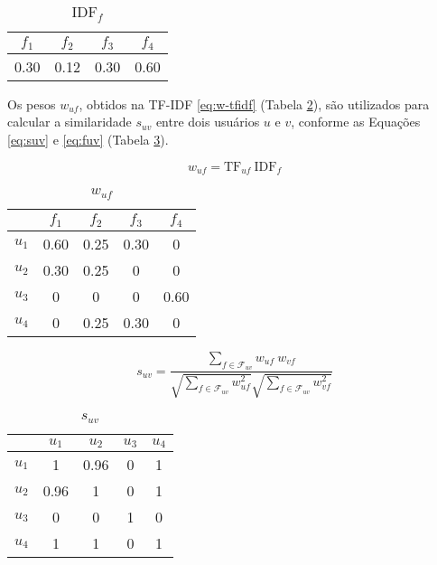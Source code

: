 \begin{table}[p]
\begin{center}
    \caption{$\mathrm{IDF}_{f}$}
    \label{tab:idf_f}
    \begin{tabular}{ | c | c | c | c | } 
    \hline
     $f_1$ & $f_2$ & $f_3$ & $f_4$   \\ \hline
     0.30 & 0.12 & 0.30 & 0.60  \\ \hline
     \end{tabular}
\end{center}
\end{table}

Os pesos $w_{uf}$, obtidos na TF-IDF \ref{eq:w-tfidf} (Tabela \ref{tab:w_uf}), são utilizados para calcular a similaridade $s_{uv}$ entre dois usuários $u$ e $v$, conforme as Equações \ref{eq:suv} e \ref{eq:fuv} (Tabela \ref{tab:s_uv}).

\begin{equation}
\label{eq:w-tfidf} 
    w_{uf} = \mathrm{TF}_{uf}~\mathrm{IDF}_{f}
\end{equation} 

\begin{table}[p]
\begin{center}
    \caption{$w_{uf}$}
    \label{tab:w_uf}
    \begin{tabular}{ | c | c | c | c | c | } 
    \hline
     & $f_1$ & $f_2$ & $f_3$ & $f_4$   \\ \hline
     $u_1$ & 0.60 & 0.25 & 0.30 & 0  \\ \hline
     $u_2$ & 0.30 & 0.25 & 0 & 0  \\ \hline
     $u_3$ & 0 & 0 & 0 & 0.60  \\ \hline
     $u_4$ & 0 & 0.25 & 0.30 & 0  \\ \hline
    \end{tabular}
\end{center}
\end{table}

\begin{equation}
\label{eq:suv}
    s_{uv} = \frac{\sum\limits_{f \in \mathcal{F}_{uv}}{w_{uf}~w_{vf}}}{\sqrt{\sum\limits_{f \in \mathcal{F}_{uv}
    }w_{uf}^2} \sqrt{\sum\limits_{f \in \mathcal{F}_{uv}}w_{vf}^2}} 
\end{equation} 

\begin{table}[p]
\begin{center}
    \caption{$s_{uv}$}
    \label{tab:s_uv}
    \begin{tabular}{ | c | c | c | c | c | } 
    \hline
     & $u_1$ & $u_2$ & $u_3$ & $u_4$   \\ \hline
     $u_1$ & 1 & 0.96 & 0 & 1  \\ \hline
     $u_2$ & 0.96 & 1 & 0 & 1  \\ \hline
     $u_3$ & 0 & 0 & 1 & 0  \\ \hline
     $u_4$ & 1 & 1 & 0 & 1  \\ \hline
    \end{tabular}
\end{center}
\end{table}

